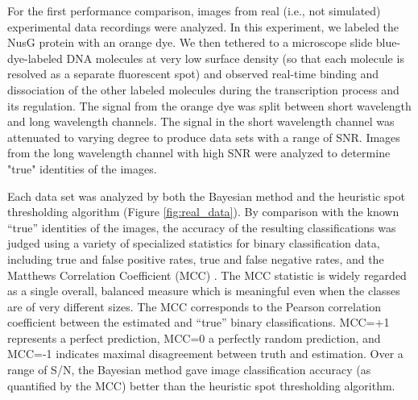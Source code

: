 For the first performance comparison, images from real (i.e., not simulated) experimental data recordings were analyzed. In this experiment, we labeled the NusG protein with an orange dye. We then tethered to a microscope slide blue-dye-labeled DNA molecules at very low surface density (so that each molecule is resolved as a separate fluorescent spot) and observed real-time binding and dissociation of the other labeled molecules during the transcription process and its regulation. The signal from the orange dye was split between short wavelength and long wavelength channels. The signal in the short wavelength channel was attenuated to varying degree to produce data sets with a range of SNR. Images from the long wavelength channel with high SNR were analyzed to determine "true" identities of the images.

Each data set was analyzed by both the Bayesian method and the heuristic spot thresholding algorithm (Figure \ref{fig:real_data}). By comparison with the known “true” identities of the images, the accuracy of the resulting classifications was judged using a variety of specialized statistics for binary classification data, including true and false positive rates, true and false negative rates, and the Matthews Correlation Coefficient (MCC) \citep{Fawcett2006-bq, Matthews1975-rw}. The MCC statistic is widely regarded as a single overall, balanced measure which is meaningful even when the classes are of very different sizes. The MCC corresponds to the Pearson correlation coefficient between the estimated and “true” binary classifications. MCC=+1 represents a perfect prediction, MCC=0 a perfectly random prediction, and MCC=-1 indicates maximal disagreement between truth and estimation. Over a range of S/N, the Bayesian method gave image classification accuracy (as quantified by the MCC) better than the heuristic spot thresholding algorithm. 

